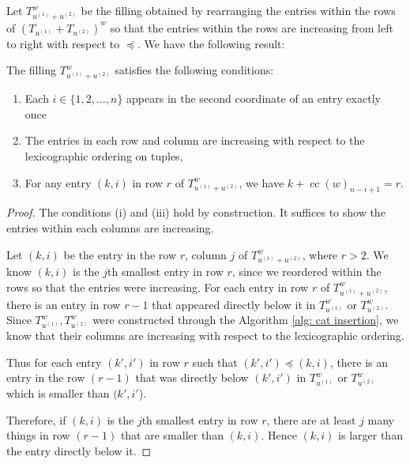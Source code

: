 \documentclass[ALCO, Unicode]{cedram}
\DeclareMathOperator{\cc}{cc}
\begin{document}
Let $T^w_{u^{(1)}+ u^{(2)}}$ be the filling obtained by rearranging the entries within the rows of $(T_{u^{(1)}}+T_{u^{(2)}})^w$ so that the entries within the rows are increasing from left to right with respect to $\preceq$.
We have the following result:
\begin{lemma}\label{lemma:row column increase}
    The filling $T^w_{u^{(1)}+ u^{(2)}}$ satisfies the following conditions:

    \begin{enumerate}[label=(\roman*)]
        \item \label{cond: i} Each $i \in \{1,2,\dots, n\}$ appears in the second coordinate of an entry exactly once 
        \item \label{cond: ii}The entries in each row and column are increasing with respect to the lexicographic ordering on tuples,
        \item \label{cond: iii}For any entry $(k,i)$ in row $r$ of $T^w_{u^{(1)}+ u^{(2)}}$, we have $k + \cc(w)_{n-i+1} = r$.
\end{enumerate}
\end{lemma}
\begin{proof}
    The conditions (i) and (iii) hold by construction. It suffices to show the entries within each columns are increasing. 
    
    Let $(k,i)$ be the entry in the row $r$, column $j$ of $T^w_{u^{(1)}+ u^{(2)}}$, where $r>2$. We know $(k,i)$ is the $j$th smallest entry in row $r$, since we reordered within the rows so that the entries were increasing.
    For each entry in row $r$ of $T^w_{u^{(1)}+ u^{(2)}}$, there is an entry in row $r-1$ that appeared directly below it in $T^w_{u^{(1)}}$ or $T^w_{u^{(2)}}$. Since $T^w_{u^{(1)}}, T^w_{u^{(2)}}$ were constructed through the Algorithm \ref{alg: cat insertion}, we know that their columns are increasing with respect to the lexicographic ordering. 
    
    Thus for each entry $(k',i')$ in row $r$ such that $(k',i')\preceq (k,i)$, there is an entry in the row $(r-1)$ that was directly below $(k',i')$ in $T^w_{u^{(1)}}$ or $T^w_{u^{(2)}}$ which is smaller than $(k',i'$). 
    
    Therefore, if $(k,i)$ is the $j$th smallest entry in row $r$, there are at least $j$ many things in row $(r-1)$ that are smaller than $(k,i)$. Hence $(k,i)$ is larger than the entry directly below it.
\end{proof}
\end{document}
